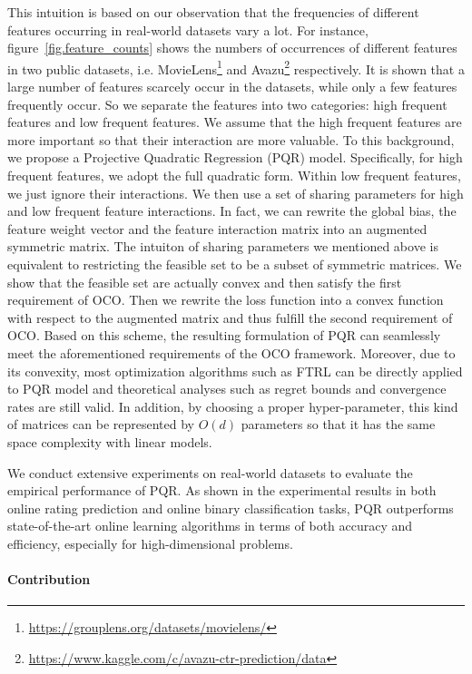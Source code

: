 \documentclass[letterpaper]{article} %
\theoremstyle{plain}
\theoremstyle{definition}
\begin{document}
This intuition is based on our observation that the frequencies of different features occurring in real-world datasets vary a lot. For instance, figure~\ref{fig.feature_counts} shows the numbers of occurrences of different features in two public datasets, i.e. MovieLens\footnote{\url{https://grouplens.org/datasets/movielens/}} and Avazu\footnote{\url{https://www.kaggle.com/c/avazu-ctr-prediction/data}} respectively. It is shown that a large number of features scarcely occur in the datasets, while only a few features frequently occur. So we separate the features into two categories: high frequent features and low frequent features. We assume that the high frequent features are more important so that their interaction are more valuable. To this background, we propose a Projective Quadratic Regression (PQR) model. Specifically, for high frequent features, we adopt the full quadratic form. Within low frequent features, we just ignore their interactions. We then use a set of sharing parameters for high and low frequent feature interactions. In fact, we can rewrite the global bias, the feature weight vector and the feature interaction matrix into an augmented symmetric matrix. The intuiton of sharing parameters we mentioned above is equivalent to restricting the feasible set to be a subset of symmetric matrices. We show that the feasible set are actually convex and then satisfy the first requirement of OCO. Then we rewrite the loss function into a convex function with respect to the augmented matrix and thus fulfill the second requirement of OCO.  Based on this scheme, the resulting formulation of PQR can seamlessly meet the aforementioned requirements of the OCO framework. Moreover, due to its convexity, most optimization algorithms such as FTRL can be directly applied to PQR model and theoretical analyses such as regret bounds and convergence rates are still valid. In addition, by choosing a proper hyper-parameter, this kind of matrices can be represented by $O(d)$ parameters so that it has the same space complexity with linear models.

We conduct extensive experiments on real-world datasets to evaluate the empirical performance of PQR. As shown in the experimental results in both online rating prediction and online binary classification tasks, PQR outperforms state-of-the-art online learning algorithms in terms of both accuracy and efficiency, especially for high-dimensional problems.

\paragraph{Contribution}
\end{document}
